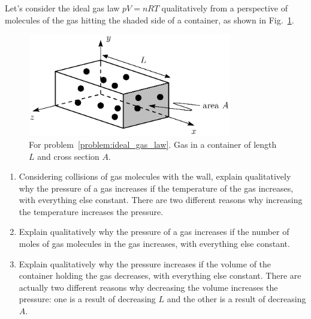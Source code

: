 \begin{problem}
  Let's consider the ideal gas law $pV = nRT$ qualitatively from a
  perspective of molecules of the gas hitting the shaded side of a
  container, as shown in Fig.~\ref{fig:ideal_gas_problem}.
  \begin{figure}[ht]
    \begin{center}
      \includegraphics[width=3.5in]{liquids_and_gases/gas_pressure.eps}
      \caption{For problem~\ref{problem:ideal_gas_law}.  Gas in a
        container of length $L$ and cross section $A$.}
      \label{fig:ideal_gas_problem}
    \end{center}
  \end{figure}
  \begin{enumerate}
  \item Considering collisions of gas molecules with the wall, explain
    qualitatively why the pressure of a gas increases if the
    temperature of the gas increases, with everything else constant.
    There are two different reasons why increasing the temperature
    increases the pressure.
  \item Explain qualitatively why the pressure of a gas increases if
    the number of moles of gas molecules in the gas increases, with
    everything else constant.
  \item Explain qualitatively why the pressure increases if the volume
    of the container holding the gas decreases, with everything else
    constant.  There are actually two different reasons why decreasing
    the volume increases the pressure: one is a result of decreasing
    $L$ and the other is a result of decreasing $A$.
  \end{enumerate}
  \label{problem:ideal_gas_law}
\end{problem}
\newpage

